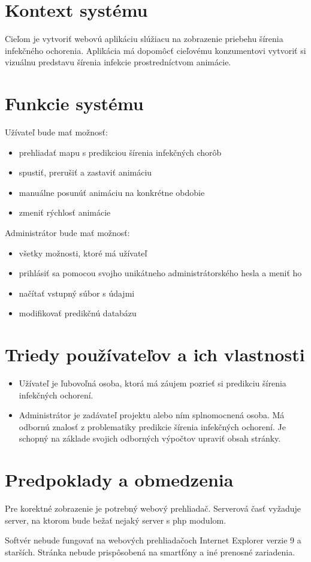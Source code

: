 \documentclass[12pt,a4paper]{report}
\begin{document}
\section[Kontext systému]{\rmfamily\bfseries
	Kontext systému}
	Cieľom je vytvoriť webovú aplikáciu slúžiacu na zobrazenie priebehu šírenia infekčného ochorenia. Aplikácia má dopomôcť cieľovému konzumentovi vytvoriť si vizuálnu predstavu šírenia infekcie prostredníctvom animácie.

\section[Funkcie systému]{\rmfamily\bfseries
	Funkcie systému}
Užívateľ bude mať možnosť:
\begin{itemize}
	\item prehliadať mapu s predikciou šírenia infekčných chorôb	
	\item spustiť, prerušiť a zastaviť animáciu
	\item manuálne posunúť animáciu na konkrétne obdobie
	\item zmeniť rýchlosť animácie
\end{itemize}
Administrátor bude mať možnosť:
\begin{itemize}
	\item všetky možnosti, ktoré má užívateľ 
	\item prihlásiť sa pomocou svojho unikátneho administrátorského hesla a meniť ho
	\item načítať vstupný súbor s údajmi
	\item modifikovať predikčnú databázu
\end{itemize}

\section[Triedy používateľov a ich vlastnosti]{\rmfamily\bfseries
	Triedy používateľov a ich vlastnosti}
\begin{itemize}
	\item Užívateľ je ľubovoľná osoba, ktorá má záujem pozrieť si predikciu šírenia infekčných ochorení.
	\item Administrátor je zadávateľ projektu alebo ním splnomocnená osoba. Má odbornú znalosť z problematiky predikcie šírenia infekčných ochorení. Je schopný
na základe svojich odborných výpočtov upraviť obsah stránky.
\end{itemize}

\section[Predpoklady a obmedzenia]{\rmfamily\bfseries
	Predpoklady a obmedzenia}
	Pre korektné zobrazenie je potrebný webový prehliadač. Serverová časť vyžaduje server, na ktorom bude bežať nejaký server s php modulom.\par
	Softvér nebude fungovať na webových prehliadačoch Internet Explorer verzie 9 a starších. Stránka nebude prispôsobená na smartfóny a iné prenosné zariadenia. 
\end{document}
